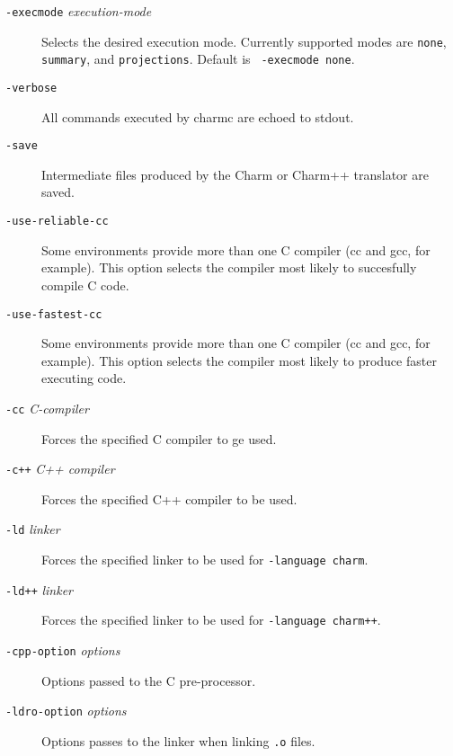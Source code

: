 \begin{description}
\item[{\tt -execmode} {\em execution-mode}]

Selects the desired execution mode.  Currently supported modes are
{\tt none}, {\tt summary}, and {\tt projections}. Default is {\tt
-execmode none}.
	
\item[{\tt -verbose}]

All commands executed by charmc are echoed to stdout.

\item[{\tt -save}]

Intermediate files produced by the Charm or Charm++ translator are saved.

\item[{\tt -use-reliable-cc}]

Some environments provide more than one C compiler (cc and gcc, for
example).  This option selects the compiler most likely to succesfully
compile C code.

\item[{\tt -use-fastest-cc}]

Some environments provide more than one C compiler (cc and gcc, for
example).  This option selects the compiler most likely to produce
faster executing code.

\item[{\tt -cc} {\em C-compiler}]

Forces the specified C compiler to ge used.

\item[{\tt -c++} {\em C++ compiler}]

Forces the specified C++ compiler to be used.

\item[{\tt -ld} {\em linker}]

Forces the specified linker to be used for {\tt -language charm}.

\item[{\tt -ld++} {\em linker}]

Forces the specified linker to be used for {\tt -language charm++}.

\item[{\tt -cpp-option} {\em options}]

Options passed to the C pre-processor.

\item[{\tt -ldro-option} {\em options}]

Options passes to the linker when linking {\tt .o} files.


\end{description}
